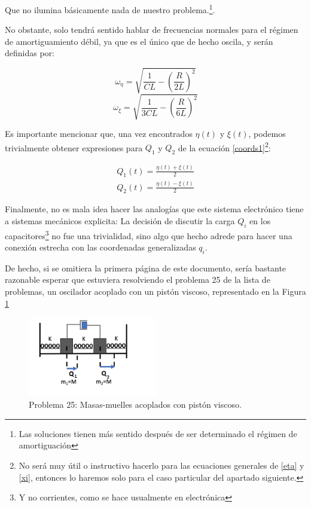 \documentclass[a4paper,12pt]{article}
\begin{document}
Que no ilumina básicamente nada de nuestro problema.\footnote{Las soluciones tienen más sentido después de ser determinado el régimen de amortiguación}. 

No obstante, solo tendrá sentido hablar de frecuencias normales para el régimen de amortiguamiento débil, ya que es el único que de hecho oscila, y serán definidas por:

\begin{equation}
  \label{eta}
  \omega_{\eta} = \sqrt{\frac{1}{CL} - \left(\frac{R}{2L}\right)^2}
\end{equation}
\begin{equation}
  \label{xi}
  \omega_{\xi} = \sqrt{\frac{1}{3CL} - \left(\frac{R}{6L}\right)^2}
\end{equation}

Es importante mencionar que, una vez encontrados $\eta(t)$ y $\xi(t)$, podemos trivialmente obtener expresiones para $Q_{1}$ y $Q_2$ de la ecuación \eqref{coords1}\footnote{No será muy útil o instructivo hacerlo para las ecuaciones generales de \eqref{eta} y \eqref{xi}, entonces lo haremos solo para el caso particular del apartado siguiente.}:

\begin{equation}
  \begin{aligned}
  \label{equonts}
    Q_1(t) = \frac{\eta(t) + \xi(t)}{2}\\
    Q_2(t) = \frac{\eta(t) - \xi(t)}{2} 
  \end{aligned}
\end{equation}

Finalmente, no es mala idea hacer las analogías que este sistema electrónico tiene a sistemas mecánicos explicita: La decisión de discutir la carga $Q_{i}$ en los capacitores\footnote{Y no corrientes, como se hace usualmente en electrónica} no fue una trivialidad, sino algo que hecho adrede para hacer una conexión estrecha con las coordenadas generalizadas $q_i$. 

De hecho, si se omitiera la primera página de este documento, sería bastante razonable esperar que estuviera resolviendo el problema 25 de la lista de problemas, un oscilador acoplado con un pistón viscoso, representado en la Figura \ref{amort}
\begin{figure}
  \centering
  \caption{Problema 25: Masas-muelles acoplados con pistón viscoso.}
  \label{amort}
  \includegraphics[width=0.5\textwidth]{amort.jpg}
\end{figure}
\end{document}
